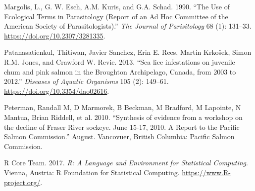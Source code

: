 \documentclass[fleqn,10pt]{wlpeerj} %
\begin{document}
\leavevmode\hypertarget{ref-Margolis1990}{}%
Margolis, L., G. W. Esch, A.M. Kuris, and G.A. Schad. 1990. ``The Use of Ecological Terms in Parasitology (Report of an Ad Hoc Committee of the American Society of Parasitologists).'' \emph{The Journal of Parisitology} 68 (1): 131--33. \url{https://doi.org/10.2307/3281335}.

\leavevmode\hypertarget{ref-Patanasatienkul2013}{}%
Patanasatienkul, Thitiwan, Javier Sanchez, Erin E. Rees, Martin Krkošek, Simon R.M. Jones, and Crawford W. Revie. 2013. ``Sea lice infestations on juvenile chum and pink salmon in the Broughton Archipelago, Canada, from 2003 to 2012.'' \emph{Diseases of Aquatic Organisms} 105 (2): 149--61. \url{https://doi.org/10.3354/dao02616}.

\leavevmode\hypertarget{ref-Peterman2010}{}%
Peterman, Randall M, D Marmorek, B Beckman, M Bradford, M Lapointe, N Mantua, Brian Riddell, et al. 2010. ``Synthesis of evidence from a workshop on the decline of Fraser River sockeye. June 15-17, 2010. A Report to the Pacific Salmon Commission.'' August. Vancovuer, British Columbia: Pacific Salmon Commission.

\leavevmode\hypertarget{ref-R}{}%
R Core Team. 2017. \emph{R: A Language and Environment for Statistical Computing}. Vienna, Austria: R Foundation for Statistical Computing. \url{https://www.R-project.org/}.
\end{document}

